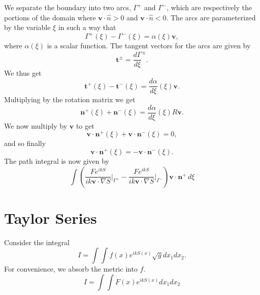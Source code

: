 \documentclass{article}
\theoremstyle{plain}
\begin{document}
We separate the boundary into two arcs, $\Gamma^+$ and $\Gamma^-$,
which are respectively the portions of the domain where $\mathbf{v}\cdot\hat{n} > 0$ and $\mathbf{v}\cdot\hat{n} < 0$.
The arcs are parameterized by the variable $\xi$ in such a way that
\begin{equation}
	\Gamma^+(\xi) - \Gamma^-(\xi) = \alpha(\xi)\mathbf{v},
\end{equation}
where $\alpha(\xi)$ is a scalar function.
The tangent vectors for the arcs are given by
\begin{equation}
	\mathbf{t}^\pm = \frac{d\Gamma}{d\xi}^\pm.
\end{equation}
We thus get
\begin{equation}
	\mathbf{t}^+(\xi) - \mathbf{t}^-(\xi) = \frac{d\alpha}{d\xi}(\xi)\mathbf{v}.
\end{equation}
Multiplying by the rotation matrix we get
\begin{equation}
	\mathbf{n}^+(\xi) + \mathbf{n}^-(\xi) = \frac{d\alpha}{d\xi}(\xi)R\mathbf{v}.
\end{equation}
We now multiply by $\mathbf{v}$ to get
\begin{equation}
	\mathbf{v}\cdot\mathbf{n}^+(\xi) + \mathbf{v}\cdot\mathbf{n}^-(\xi) = 0,
\end{equation}
and so finally
\begin{equation}
	\mathbf{v}\cdot\mathbf{n}^+(\xi) = -\mathbf{v}\cdot\mathbf{n}^-(\xi).
\end{equation}
The path integral is now given by
\begin{equation}
	 \int \left( \frac{Fe^{ikS}}{ik\mathbf{v}\cdot\nabla S}\rvert_{\Gamma^+}
	 - \frac{Fe^{ikS}}{ik\mathbf{v}\cdot\nabla S}\rvert_{\Gamma^-} \right)\mathbf{v}\cdot\mathbf{n}^+ \,d\xi
\end{equation}



\section{Taylor Series}


Consider the integral
\begin{equation}
	I = \int\int f(x) e^{ikS(x)} \sqrt{g} dx_1dx_2.
\end{equation}
For convenience, we absorb the metric into $f$.
\begin{equation}
	I = \int\int F(x) e^{ikS(x)} dx_1dx_2
\end{equation}
\end{document}
